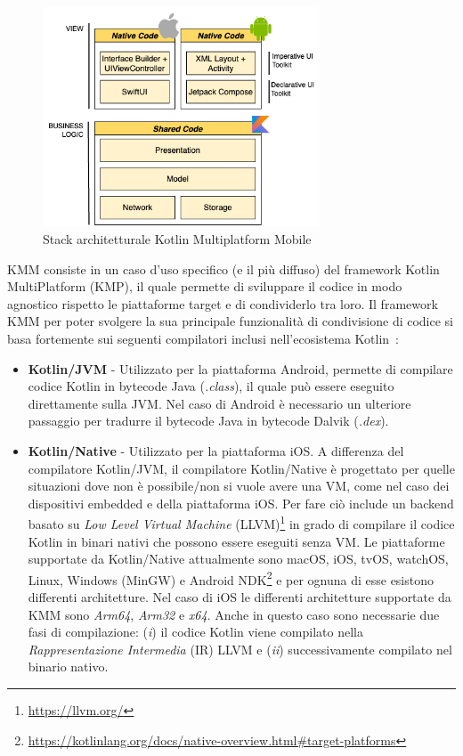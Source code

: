 \begin{figure}[H]
    \centering
    \includegraphics[width=0.73\textwidth]{img/stack_kmm.png}
    \caption{Stack architetturale Kotlin Multiplatform Mobile}
    \label{stackKMM}
\end{figure}

KMM consiste in un caso d'uso specifico (e il più diffuso) del framework Kotlin MultiPlatform (KMP),
il quale permette di sviluppare il codice in modo agnostico rispetto le piattaforme target e di condividerlo tra loro. 
Il framework KMM per poter svolgere la sua principale funzionalità di condivisione di codice si basa fortemente sui seguenti compilatori inclusi nell'ecosistema Kotlin~\cite{nagy2022simplifying}:

\begin{itemize}
    \item \textbf{Kotlin/JVM} - Utilizzato per la piattaforma Android, permette di compilare codice Kotlin in bytecode Java (\textit{.class}), il quale può essere eseguito direttamente sulla JVM. Nel caso di Android è necessario un ulteriore passaggio per tradurre il bytecode Java in bytecode Dalvik (\textit{.dex}).

    \item \textbf{Kotlin/Native} - Utilizzato per la piattaforma iOS. A differenza del compilatore Kotlin/JVM, il compilatore Kotlin/Native è progettato per quelle situazioni dove non è possibile/non si vuole avere una VM, come nel caso dei dispositivi embedded e della piattaforma iOS. Per fare ciò include un backend basato su \textit{Low Level Virtual Machine} (LLVM)\footnote{\href{https://llvm.org/}{https://llvm.org/}} in grado di compilare il codice Kotlin in binari nativi che possono essere eseguiti senza VM\cite{nagy2022simplifying}. Le piattaforme supportate da Kotlin/Native attualmente sono macOS, iOS, tvOS, watchOS, Linux, Windows (MinGW) e Android NDK\footnote{\href{https://kotlinlang.org/docs/native-overview.html\#target-platforms}{https://kotlinlang.org/docs/native-overview.html\#target-platforms}} e per ognuna di esse esistono differenti architetture. Nel caso di iOS le differenti architetture supportate da KMM sono \textit{Arm64}, \textit{Arm32} e \textit{x64}. Anche in questo caso sono necessarie due fasi di compilazione: (\textit{i}) il codice Kotlin viene compilato nella \textit{Rappresentazione Intermedia} (IR) LLVM e (\textit{ii}) successivamente compilato nel binario nativo.
\end{itemize}


